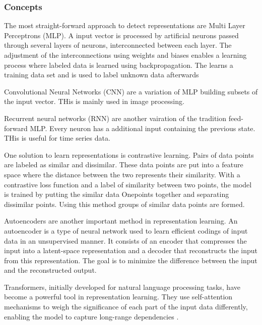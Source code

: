 \subsubsection{Concepts}
The most straight-forward approach to detect representations are Multi Layer Perceptrons (MLP). A input vector is processed by artificial neurons passed through several layers of neurons, interconnected between each layer. The adjustment of the interconnections using weights and biases enables a learning process where labeled data is learned using backpropagation. The learns a training data set and is used to label unknown data afterwards \cite{nielsen_neural_2015}

Convolutional Neural Networks (CNN) are a variation of MLP building subsets of the input vector. THis is mainly used in image processing.

Recurrent neural networks (RNN) are another vairation of the tradition feed-forward MLP. Every neuron has a additional input containing the previous state. THis is useful for time series data.

One solution to learn representations is contrastive learning. Pairs of data points are labeled as similar and dissimilar. These data points are put into a feature space where the distance between the two represents their similarity. With a contrastive loss function and a label of similarity between two points, the model is trained by putting the similar data Onepoints together and separating dissimilar points. Using this method groups of similar data points are formed.

Autoencoders are another important method in representation learning. An autoencoder is a type of neural network used to learn efficient codings of input data in an unsupervised manner. It consists of an encoder that compresses the input into a latent-space representation and a decoder that reconstructs the input from this representation. The goal is to minimize the difference between the input and the reconstructed output.


Transformers, initially developed for natural language processing tasks, have become a powerful tool in representation learning. They use self-attention mechanisms to weigh the significance of each part of the input data differently, enabling the model to capture long-range dependencies \cite{vaswani_attention_2017}.

